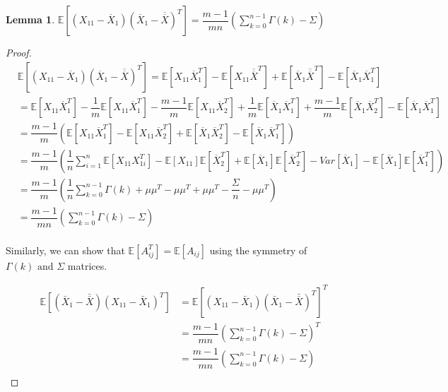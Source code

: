 \documentclass[12pt]{article}
\newtheorem{lemma}{Lemma}
\begin{document}
 
\begin{lemma} \label{lemma:bias1}
$\mathbb{E}[(X_{11}-\overline{X}_1)(\overline{X}_1 - \overline{\overline{X}})^T] = \dfrac{m-1}{mn}\left(\sum\limits_{k=0}^{n-1}\Gamma(k) - \Sigma\right)$
\end{lemma}
\begin{proof}
\begin{align*}
    &\mathbb{E}[(X_{11}-\overline{X}_1)(\overline{X}_1 - \overline{\overline{X}})^T] = \mathbb{E}[X_{11}\overline{X}_1^T] - \mathbb{E}[X_{11}\overline{\overline{X}}^T] + \mathbb{E}[\overline{X}_1\overline{\overline{X}}^T] - \mathbb{E}[\overline{X}_1\overline{X}_1^T]\\
    &= \mathbb{E}[X_{11}\overline{X}_1^T] - \dfrac{1}{m}\mathbb{E}[X_{11}\overline{X}_1^T] - \dfrac{m-1}{m}\mathbb{E}[X_{11}\overline{X}_2^T] + \dfrac{1}{m}\mathbb{E}[\overline{X}_1\overline{X}_1^T] + \dfrac{m-1}{m}\mathbb{E}[\overline{X}_1\overline{X}_2^T] - \mathbb{E}[\overline{X}_1\overline{X}_1^T]\\
    &= \dfrac{m-1}{m}\left(\mathbb{E}[X_{11}\overline{X}_1^T] - \mathbb{E}[X_{11}\overline{X}_2^T] + \mathbb{E}[\overline{X}_1\overline{X}_2^T] - \mathbb{E}[\overline{X}_1\overline{X}_1^T]\right)\\
    &= \dfrac{m-1}{m}\left(\dfrac{1}{n}\sum_{i=1}^{n}\mathbb{E}[X_{11}X_{1i}^T] - \mathbb{E}[X_{11}]\mathbb{E}[\overline{X}_2^T] + \mathbb{E}[\overline{X}_1]\mathbb{E}[\overline{X}_2^T] - Var[\overline{X}_1] - \mathbb{E}[\overline{X}_1]\mathbb{E}[\overline{X}_1^T]\right)\\
    &= \dfrac{m-1}{m}\left(\dfrac{1}{n}\sum_{k=0}^{n-1}\Gamma(k) + \mu \mu^T - \mu \mu^T + \mu \mu^T - \dfrac{\Sigma}{n} - \mu \mu^T\right)\\
    &= \dfrac{m-1}{mn}\left(\sum_{k=0}^{n-1}\Gamma(k) - \Sigma\right)
\end{align*}
\\   
Similarly, we can show that $\mathbb{E}[A_{ij}^T] = \mathbb{E}[A_{ij}]$ using the symmetry of $\Gamma(k) \textrm{ and } \Sigma$ matrices.
    
\begin{align*}
    \mathbb{E}[(\bar{X}_1 - \bar{\bar{X}})(X_{11}-\bar{X}_1)^T] &= \mathbb{E}[(X_{11}-\bar{X}_1)(\bar{X}_1 - \bar{\bar{X}})^T]^T\\
    &= \dfrac{m-1}{mn}\left(\sum_{k=0}^{n-1}\Gamma(k) - \Sigma \right)^T\\
    &= \dfrac{m-1}{mn}\left(\sum_{k=0}^{n-1}\Gamma(k) - \Sigma \right)\\
\end{align*}
\end{proof}
\end{document}
